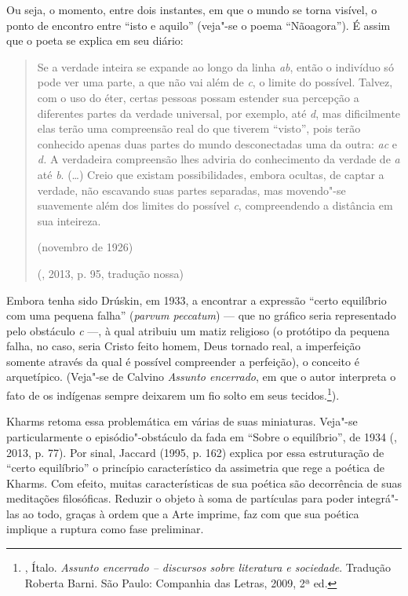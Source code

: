 Ou seja, o momento, entre dois instantes, em que o mundo se torna
visível, o ponto de encontro entre ``isto e aquilo'' (veja"-se o poema
``Nãoagora''). É assim que o poeta se explica em seu diário:

\begin{quotation}
Se a verdade inteira se expande ao longo da linha \emph{ab}, então o
indivíduo só pode ver uma parte, a que não vai além de \emph{c}, o
limite do possível. Talvez, com o uso do éter, certas pessoas possam estender sua percepção a
diferentes partes da verdade universal, por exemplo, até \emph{d}, mas
dificilmente elas terão uma compreensão real do que tiverem ``visto'',
pois terão conhecido apenas duas partes do mundo desconectadas uma da
outra: \emph{ac} e \emph{d.} A verdadeira compreensão lhes adviria do
conhecimento da verdade de \emph{a} até \emph{b}. (\ldots{}) Creio que
existam possibilidades, embora ocultas, de captar a verdade, não
escavando suas partes separadas, mas movendo"-se suavemente além dos
limites do possível \emph{c}, compreendendo a distância em sua
inteireza.

(novembro de 1926)

(, 2013, p. 95, tradução nossa)
\end{quotation}

Embora tenha sido Drúskin, em 1933, a encontrar a expressão ``certo
equilíbrio com uma pequena falha'' (\emph{parvum peccatum}) --- que no
gráfico seria representado pelo obstáculo \emph{c} ---, à qual
atribuiu um matiz religioso (o protótipo da pequena falha,
no caso, seria Cristo feito homem, Deus tornado real, a imperfeição
somente através da qual é possível compreender a perfeição), o conceito
é arquetípico. (Veja"-se de Calvino \emph{Assunto
encerrado}, em que o autor interpreta o fato de os indígenas sempre
deixarem um fio solto em seus tecidos.\footnote{, Ítalo. \emph{Assunto encerrado -- discursos sobre literatura e sociedade}. Tradução Roberta Barni. São Paulo: Companhia das Letras, 2009, 2ª ed.}).

Kharms retoma essa problemática em várias de suas miniaturas. Veja"-se
particularmente o episódio"-obstáculo da fada em ``Sobre o equilíbrio'',
de 1934 (, 2013, p. 77). Por sinal, Jaccard (1995, p. 162)
explica por essa estruturação de ``certo equilíbrio'' o princípio característico da
assimetria que rege a poética de Kharms. Com efeito, muitas
características de sua poética são decorrência de suas meditações filosóficas. Reduzir o objeto à soma de
partículas para poder integrá"-las ao todo, graças à ordem que a Arte
imprime, faz com que sua poética implique a ruptura como fase
preliminar.

